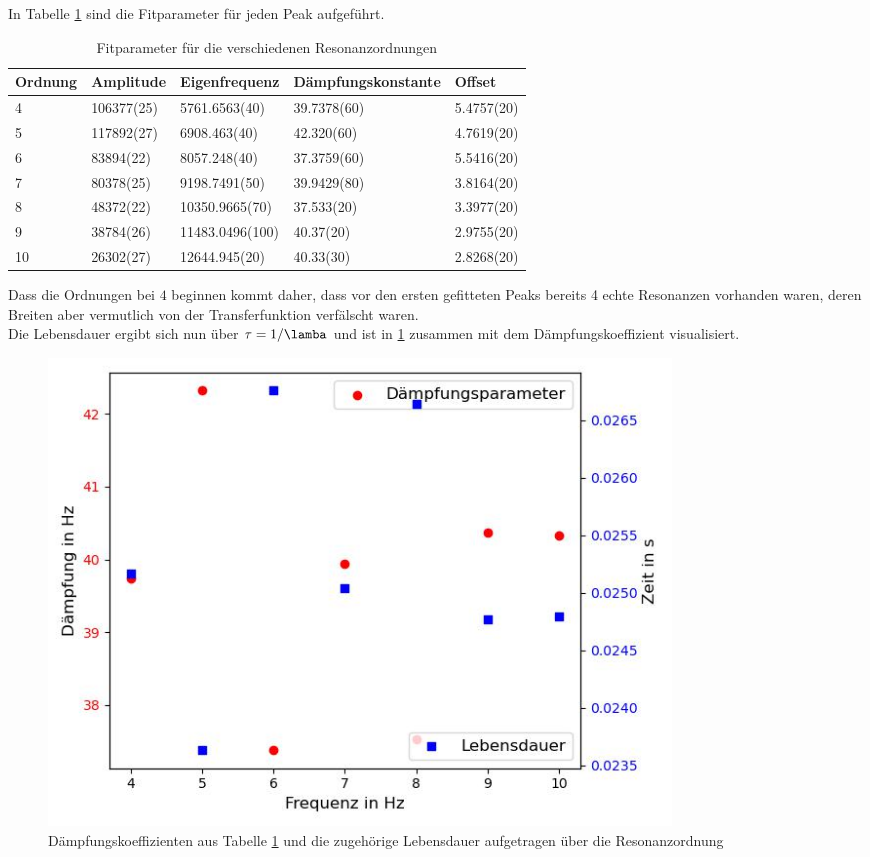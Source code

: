 \documentclass[../main.tex]{subfiles}
\begin{document}
       In Tabelle \ref{tab:I_f_LorentzParameter} sind die Fitparameter für jeden Peak aufgeführt.

       \begin{table}[H]
        \centering
        \begin{tabular}{l|l|l|l|l}
            \textbf{Ordnung} & \textbf{Amplitude} & \textbf{Eigenfrequenz} & \textbf{Dämpfungskonstante} & \textbf{Offset}\\
            \hline
            4 & 106377(25) & 5761.6563(40) & 39.7378(60) & 5.4757(20)\\
            \hline
            5 & 117892(27) & 6908.463(40) & 42.320(60) & 4.7619(20)\\
            \hline
            6 & 83894(22) & 8057.248(40) & 37.3759(60) & 5.5416(20)\\
            \hline
            7 & 80378(25) & 9198.7491(50) & 39.9429(80) & 3.8164(20)\\
            \hline
            8 & 48372(22) & 10350.9665(70) & 37.533(20) & 3.3977(20)\\
            \hline
            9 & 38784(26) & 11483.0496(100) & 40.37(20) & 2.9755(20)\\
            \hline
            10 & 26302(27) & 12644.945(20) & 40.33(30) & 2.8268(20)
        \end{tabular}
        \caption{Fitparameter für die verschiedenen Resonanzordnungen}
        \label{tab:I_f_LorentzParameter}
    \end{table}
    
    Dass die Ordnungen bei $4$ beginnen kommt daher, dass vor den ersten gefitteten Peaks bereits 4 echte Resonanzen vorhanden waren, deren Breiten aber vermutlich von der Transferfunktion verfälscht waren.\\
    
    Die Lebensdauer ergibt sich nun über $\tau=1/\lamba$ und ist in \ref{fig:I_f_Lebensdauer} zusammen mit dem Dämpfungskoeffizient visualisiert.

    \begin{figure}[H]
        \centering
        \includegraphics[width=0.8\textwidth]{Bilddateien/Auswertung/I_f_Lebensdauer.jpg}
        \caption{Dämpfungskoeffizienten aus Tabelle \ref{tab:I_f_LorentzParameter} und die zugehörige Lebensdauer aufgetragen über die Resonanzordnung}
        \label{fig:I_f_Lebensdauer}
    \end{figure}
\end{document}

